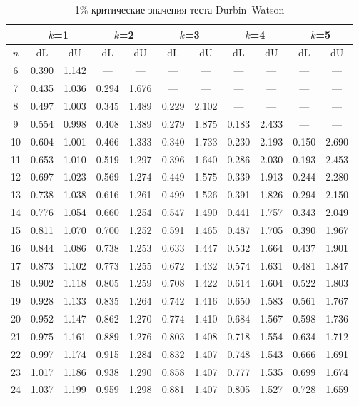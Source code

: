 \documentclass[12pt]{article}
\begin{document}
\begin{table}
\caption{1\% критические значения теста Durbin--Watson}
\begin{center}
{\scriptsize
\begin{tabular}{|c|c|c|c|c|c|c|c|c|c|c|}
	\hline
	& \multicolumn{2}{c|}{$k$=1} & \multicolumn{2}{c|}{$k$=2}&
	\multicolumn{2}{c|}{$k$=3} & \multicolumn{2}{c|}{$k$=4} &
	\multicolumn{2}{c|}{$k$=5} \\ \hline
	$n$ & dL& dU& dL &dU & dL &dU &dL& dU &dL& dU\\ \hline
	6& 0.390&1.142&---&---&---&---&---&---&---&---\\
	7&0.435&1.036&0.294&1.676&---&---&---&---&---&---\\
	8&0.497&1.003&0.345&1.489&	0.229&2.102&---&---&---&---\\
	9&0.554&0.998&0.408&1.389&0.279&1.875& 0.183&2.433&---&---\\
	10&0.604&1.001&0.466&1.333&0.340&1.733&0.230&2.193& 0.150&2.690\\
	11&0.653&1.010&0.519&1.297&0.396&1.640&0.286&2.030&0.193&2.453\\
	12&0.697&1.023&0.569&1.274&0.449&1.575&0.339&1.913&0.244&2.280\\
	13&0.738&1.038&0.616&1.261&0.499&1.526&0.391&1.826&0.294&2.150\\
	14&0.776&1.054&0.660&1.254&0.547&1.490&0.441&1.757&0.343&2.049\\
	15&0.811&1.070&0.700&1.252&0.591&1.465&0.487&1.705&0.390&1.967\\
	16&0.844&1.086&0.738&1.253&0.633&1.447&0.532&1.664&0.437&1.901\\
	17&0.873&1.102&0.773&1.255&0.672&1.432&0.574&1.631&0.481&1.847\\
	18&0.902&1.118&0.805&1.259&0.708&1.422&0.614&1.604&0.522&1.803\\
	19&0.928&1.133&0.835&1.264&0.742&1.416&0.650&1.583&0.561&1.767\\
	20&0.952&1.147&0.862&1.270&0.774&1.410&0.684&1.567&0.598&1.736\\
	21&0.975&1.161&0.889&1.276&0.803&1.408&0.718&1.554&0.634&1.712\\
	22&0.997&1.174&0.915&1.284&0.832&1.407&0.748&1.543&0.666&1.691\\
	23&1.017&1.186&0.938&1.290&0.858&1.407&0.777&1.535&0.699&1.674\\
	24&1.037&1.199&0.959&1.298&0.881&1.407&0.805&1.527&0.728&1.659\\

\end{tabular}}
\end{center}
\end{table}
\end{document}
